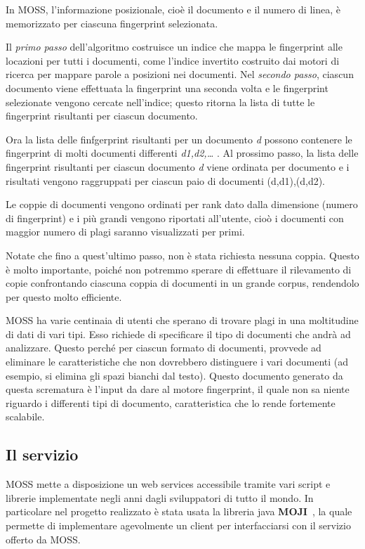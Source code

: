 			In MOSS, l'informazione posizionale, cioè il documento e il numero di linea, è memorizzato per ciascuna fingerprint selezionata. 
			
			Il \textit{primo passo} dell'algoritmo costruisce un indice che mappa le fingerprint alle locazioni per tutti i documenti, come l'indice invertito costruito dai motori di ricerca per mappare parole a posizioni nei documenti.
			Nel \textit{secondo passo}, ciascun documento viene effettuata la fingerprint una seconda volta e le fingerprint selezionate vengono cercate nell'indice; questo ritorna la lista di tutte le fingerprint risultanti per ciascun documento. 
			
			Ora la lista delle finfgerprint risultanti per un documento \textit{d} possono contenere le fingerprint di molti documenti differenti \textit{ d1,d2,… }.
			Al prossimo passo, la lista delle fingerprint risultanti per ciascun documento \textit{d} viene ordinata per documento e i risultati vengono raggruppati per ciascun paio di documenti (d,d1),(d,d2). 
			
			Le coppie di documenti vengono ordinati per rank dato dalla dimensione (numero di fingerprint) e i più grandi vengono riportati all'utente, cioò i documenti con maggior numero di plagi saranno visualizzati per primi. 
			
			Notate che fino a quest'ultimo passo, non è stata richiesta nessuna coppia. 
			Questo è molto importante, poiché non potremmo sperare di effettuare il rilevamento di copie confrontando ciascuna coppia di documenti in un grande corpus, rendendolo per questo molto efficiente.
	
			MOSS ha varie centinaia di utenti che sperano di trovare plagi in una moltitudine di dati di vari tipi. Esso richiede di specificare il tipo di documenti che andrà ad analizzare. Questo perché per ciascun formato di documenti, provvede ad eliminare le caratteristiche che non dovrebbero distinguere i vari documenti (ad esempio, si elimina gli spazi bianchi dal testo). 
			Questo documento generato da questa scrematura è l'input da dare al motore fingerprint, il quale non sa niente riguardo i differenti tipi di documento, caratteristica che lo rende fortemente scalabile.
		
		\subsection*{Il servizio}
			MOSS mette a disposizione un web services accessibile tramite vari script e librerie implementate negli anni dagli sviluppatori di tutto il mondo. In particolare nel progetto realizzato è stata usata la libreria java \textbf{MOJI}~\citep{MOJI}, la quale permette di implementare agevolmente un client per interfacciarsi con il servizio offerto da MOSS.
			
